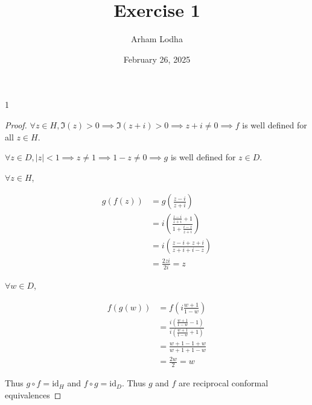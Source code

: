 \documentclass{article}
\newcommand*{\id}{\mathrm{id}}
\newcommand{\abs}[1]{\left\lvert #1\right\rvert}
\begin{document}
\title{Exercise 1}
\author{Arham Lodha}%
\date{February 26, 2025}%
\maketitle

\begin{PROB}{1}\label{Problem 1.}
\end{PROB}
\begin{proof}
    $\forall z \in H, \Im(z) > 0 \implies \Im(z + i) > 0 \implies z + i \neq 0 \implies f$ is well defined for all $z \in H$. 
    
    $\forall z \in D, \abs{z} < 1 \implies z \neq 1 \implies 1 - z \neq 0 \implies g$ is well defined for $z \in D$.

    $\forall z \in H$, 
    
    \begin{align*}
        g(f(z)) &= g\left(\frac{z - i}{z + i}\right) \\
        &= i \left(\frac{\frac{z - i}{z + i} + 1}{1 + \frac{i - z}{z + i}}\right) \\
        &= i \left(\frac{z - i + z + i}{z + i + i - z}\right) \\
        &= \frac{2zi}{2i} = z
    \end{align*}

    $\forall w \in D$, 
    
    \begin{align*}
        f(g(w)) &= f\left(i\frac{w + 1}{1 - w}\right) \\
        &= \frac{i(\frac{w + 1}{1 - w} - 1)}{i\left(\frac{w + 1}{1 - w} + 1\right)} \\
        &= \frac{w + 1 - 1 + w}{w + 1 + 1 - w} \\
        &= \frac{2w}{2} = w
    \end{align*}

    Thus $g \circ f = \id_{H}$ and $f \circ g = \id_{D}$. Thus $g$ and $f$ are reciprocal conformal equivalences  
\end{proof}

\bigskip
\end{document}
